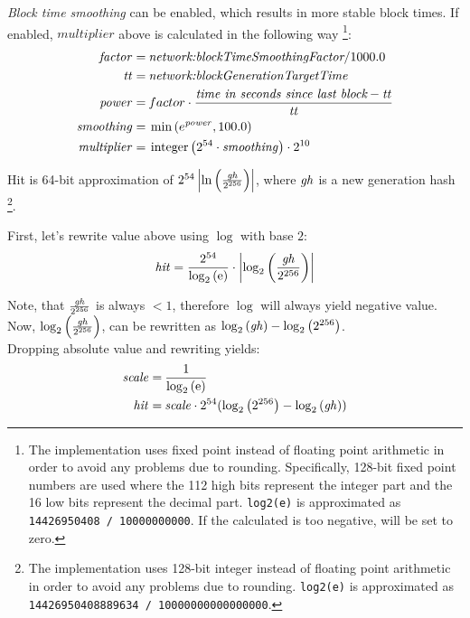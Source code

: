 \emph{Block time smoothing} can be enabled, which results in more stable block times.
If enabled, $multiplier$ above is calculated in the following way
\footnote{
	The implementation uses fixed point instead of floating point arithmetic in order to avoid any problems due to rounding.
	Specifically, 128-bit fixed point numbers are used where the 112 high bits represent the integer part and the 16 low bits represent the decimal part.
	\texttt{log2(e)} is approximated as \texttt{14426950408 / 10000000000}.
	If the calculated  is too negative,  will be set to zero.
}:
\begin{align*}
\mathvar{factor} = \: & \nemsetting{network}{blockTimeSmoothingFactor} / 1000.0 \\
\mathvar{tt} = \: & \nemsetting{network}{blockGenerationTargetTime} \\
\mathvar{power} = \: & factor \cdot \frac{\mathname{time in seconds since last block} - \mathvar{tt}}{\mathvar{tt}} \\
\mathvar{smoothing} = \: & \min\left(e^{\mathvar{power}}, 100.0\right) \\
\mathvar{multiplier} = \: & \mathfunc{integer}\left(2^{54} \cdot \mathvar{smoothing}\right) \cdot 2^{10}
\end{align*}

Hit is 64-bit approximation of $2^{54} \left|\ln\left(\frac{\mathit{gh}}{2^{256}}\right)\right|$, where $\mathit{gh}$ is a new generation hash
\footnote{
	The implementation uses 128-bit integer instead of floating point arithmetic in order to avoid any problems due to rounding.
	\texttt{log2(e)} is approximated as \texttt{14426950408889634 / 10000000000000000}.
}.

First, let's rewrite value above using $\log$ with base $2$:
$$
\mathit{hit} = \frac{2^{54}}{\log_2\left(\mathrm{e}\right)} \cdot \left|\log_2\left(\frac{\mathit{gh}}{2^{256}}\right)\right|
$$

Note, that $\frac{\mathit{gh}}{2^{256}}$ is always $< 1$, therefore $\log$ will always yield negative value. \\
Now, $\log_2\left(\frac{\mathit{gh}}{2^{256}}\right)$, can be rewritten as $\log_2\left(\mathit{gh}\right) - \log_2\left(2^{256}\right)$. \\

Dropping absolute value and rewriting yields:
\begin{align*}
	\mathit{scale} = \: & \frac{1}{\log_2\left(\mathrm{e}\right)} \\
	\mathit{hit} = \: & \mathit{scale} \cdot 2^{54} (\log_2\left(2^{256}\right) - \log_2\left(\mathit{gh}\right))
\end{align*}

